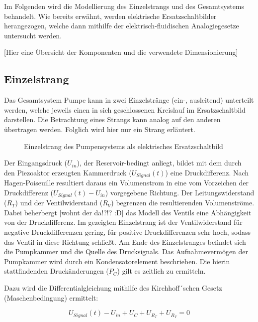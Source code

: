\documentclass[fontsize=12pt, a4paper]{scrartcl}
\begin{document}
Im Folgenden wird die Modellierung des Einzelstrangs und des Gesamtsystems behandelt.
Wie bereits erwähnt, werden elektrische Ersatzschaltbilder herangezogen, welche dann mithilfe der elektrisch-fluidischen Analogiegesetze untersucht werden.

[Hier eine Übersicht der Komponenten und die verwendete Dimensionierung]

\subsection{Einzelstrang}

Das Gesamtsystem Pumpe kann in zwei Einzelstränge (ein-, ausleitend) unterteilt werden, welche jeweils einen in sich geschlossenen Kreislauf im Ersatzschaltbild darstellen.
Die Betrachtung eines Strangs kann analog auf den anderen übertragen werden. Folglich wird hier nur ein Strang erläutert.

\begin{figure}
	
	\caption{Einzelstrang des Pumpensystems als elektrisches Ersatzschaltbild}
	\label{singlebranch}
\end{figure}

Der Eingangsdruck ($U_{in}$), der Reservoir-bedingt anliegt, bildet mit dem durch den Piezoaktor erzeugten Kammerdruck ($U_{Signal}(t)$) eine Druckdifferenz. Nach Hagen-Poiseuille resultiert daraus ein Volumenstrom in eine vom Vorzeichen der Druckdifferenz ($U_{Signal}(t)-U_{in}$) vorgegebene Richtung. Der Leitungswiderstand ($R_{T}$) und der Ventilwiderstand ($R_{V}$) begrenzen die resultierenden Volumenströme. Dabei beherbergt [wohnt der da!?!? :D] das Modell des Ventils eine Abhängigkeit von der Druckdifferenz. Im gezeigten Einzelstrang ist der Ventilwiderstand für negative Druckdifferenzen gering, für positive Druckdifferenzen sehr hoch, sodass das Ventil in diese Richtung schließt. Am Ende des Einzelstranges befindet sich die Pumpkammer und die Quelle des Drucksignals. Das Aufnahmevermögen der Pumpkammer wird durch ein Kondensatorelement beschrieben. Die hierin stattfindenden Druckänderungen ($P_{C}$) gilt es zeitlich zu ermitteln.

Dazu wird die Differentialgleichung mithilfe des Kirchhoff´schen Gesetz (Maschenbedingung) ermittelt:

\begin{equation}
	U_{Signal}(t) - U_{in} + U_{C} + U_{R_{T}} + U_{R_{V}} = 0
\end{equation}
\end{document}
